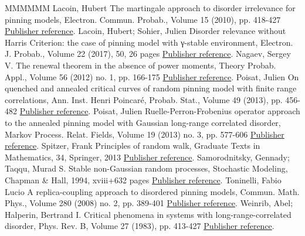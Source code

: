 \documentclass[11pt]{article}
\theoremstyle{definition}
\numberwithin{equation}{section}
\numberwithin{figure}{section}
\numberwithin{table}{section}
\begin{document}
\begin{thebibliography}{MMMMMM}
 Lacoin, Hubert The martingale approach to disorder irrelevance for pinning models, Electron. Commun. Probab., Volume 15 (2010), pp. 418-427 \href{https://ahl.centre-mersenne.org/item/AHL_2019__2__281_0/#L10}{Publisher reference}.
 Lacoin, Hubert; Sohier, Julien Disorder relevance without Harris Criterion: the case of pinning model with γ-stable environment, Electron. J. Probab., Volume 22 (2017), 50, 26 pages \href{https://ahl.centre-mersenne.org/item/AHL_2019__2__281_0/#LS16+}{Publisher reference}.
 Nagaev, Sergey V. The renewal theorem in the absence of power moments, Theory Probab. Appl., Volume 56 (2012) no. 1, pp. 166-175 \href{https://ahl.centre-mersenne.org/item/AHL_2019__2__281_0/#Na2012}{Publisher reference}.
 Poisat, Julien On quenched and annealed critical curves of random pinning model with finite range correlations, Ann. Inst. Henri Poincaré, Probab. Stat., Volume 49 (2013), pp. 456-482 \href{https://ahl.centre-mersenne.org/item/AHL_2019__2__281_0/#P13a}{Publisher reference}.
 Poisat, Julien Ruelle-Perron-Frobenius operator approach to the annealed pinning model with Gaussian long-range correlated disorder, Markov Process. Relat. Fields, Volume 19 (2013) no. 3, pp. 577-606 \href{https://ahl.centre-mersenne.org/item/AHL_2019__2__281_0/#P13}{Publisher reference}.
 Spitzer, Frank Principles of random walk, Graduate Texts in Mathematics, 34, Springer, 2013 \href{https://ahl.centre-mersenne.org/item/AHL_2019__2__281_0/#Spitzer}{Publisher reference}.
 Samorodnitsky, Gennady; Taqqu, Murad S. Stable non-Gaussian random processes, Stochastic Modeling, Chapman \& Hall, 1994, xviii+632 pages \href{https://ahl.centre-mersenne.org/item/AHL_2019__2__281_0/#ST94}{Publisher reference}.
 Toninelli, Fabio Lucio A replica-coupling approach to disordered pinning models, Commun. Math. Phys., Volume 280 (2008) no. 2, pp. 389-401 \href{https://ahl.centre-mersenne.org/item/AHL_2019__2__281_0/#T08}{Publisher reference}.
 Weinrib, Abel; Halperin, Bertrand I. Critical phenomena in systems with long-range-correlated disorder, Phys. Rev. B, Volume 27 (1983), pp. 413-427 \href{https://ahl.centre-mersenne.org/item/AHL_2019__2__281_0/#WH83}{Publisher reference}.
\end{thebibliography}
\end{document}
